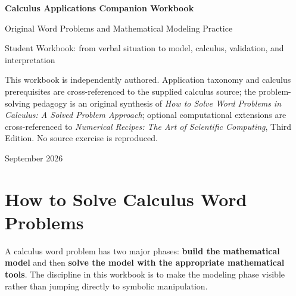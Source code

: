 \documentclass[11pt]{book}
\begin{document}
\frontmatter
\begin{titlepage}
\centering
\vspace*{1.1in}
{\Huge\bfseries\color{navy} Calculus Applications Companion Workbook\par}
\vspace{0.25in}
{\Large\color{blue} Original Word Problems and Mathematical Modeling Practice\par}
\vspace{0.45in}
{\large Student Workbook: from verbal situation to model, calculus, validation, and interpretation\par}
\vfill
\begin{minipage}{0.82\textwidth}\small
This workbook is independently authored. Application taxonomy and calculus prerequisites are
cross-referenced to the supplied calculus source; the problem-solving pedagogy is an original synthesis
of \emph{How to Solve Word Problems in Calculus: A Solved Problem Approach}; optional computational
extensions are cross-referenced to \emph{Numerical Recipes: The Art of Scientific Computing}, Third Edition.
No source exercise is reproduced.
\end{minipage}
\vfill
{\large September 2026\par}
\end{titlepage}
\tableofcontents
\mainmatter
\chapter{How to Solve Calculus Word Problems}
\begin{strategybox}
A calculus word problem has two major phases: \textbf{build the mathematical model} and then
\textbf{solve the model with the appropriate mathematical tools}. The discipline in this workbook is to
make the modeling phase visible rather than jumping directly to symbolic manipulation.
\end{strategybox}
\end{document}
